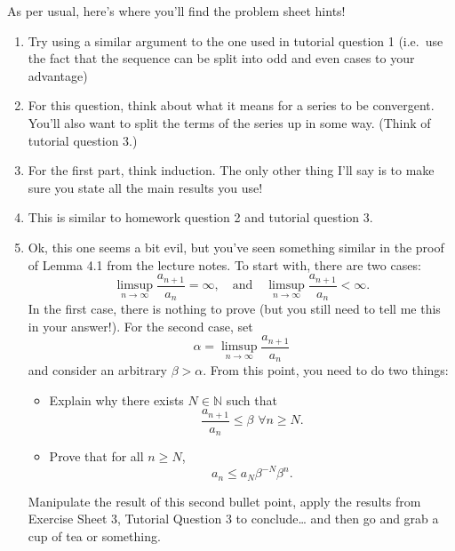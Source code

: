 \documentclass[
  12pt,
  a4paper]{extarticle}
\providecommand{\tightlist}{%
  \setlength{\itemsep}{0pt}\setlength{\parskip}{0pt}}
\theoremstyle{plain}
\theoremstyle{definition}
\theoremstyle{plain}
\theoremstyle{plain}
\theoremstyle{plain}
\theoremstyle{plain}
\theoremstyle{definition}
\theoremstyle{definition}
\theoremstyle{remark}
\theoremstyle{remark}
\renewcommand{\;}{\,}
\begin{document}
As per usual, here's where you'll find the problem sheet hints!

\begin{enumerate}
\def\labelenumi{\arabic{enumi}.}
\item
  Try using a similar argument to the one used in tutorial question 1 (i.e.~use the fact that the sequence can be split into odd and even cases to your advantage)
\item
  For this question, think about what it means for a series to be convergent. You'll also want to split the terms of the series up in some way. (Think of tutorial question 3.)
\item
  For the first part, think induction. The only other thing I'll say is to make sure you state all the main results you use!
\item
  This is similar to homework question 2 and tutorial question 3.
\item
  Ok, this one seems a bit evil, but you've seen something similar in the proof of Lemma 4.1 from the lecture notes. To start with, there are two cases: \[\limsup_{n\to\infty}\frac{a_{n+1}}{a_n} = \infty, \quad \text{and} \quad \limsup_{n\to\infty}\frac{a_{n+1}}{a_n}<\infty.\] In the first case, there is nothing to prove (but you still need to tell me this in your answer!). For the second case, set \[\alpha = \limsup_{n\to\infty}\frac{a_{n+1}}{a_n}\] and consider an arbitrary \(\beta > \alpha.\) From this point, you need to do two things:

  \begin{itemize}
  \tightlist
  \item
    Explain why there exists \(N\in\mathbb{N}\) such that \[\frac{a_{n+1}}{a_n} \leq \beta \;\; \forall n \geq N.\]
  \item
    Prove that for all \(n \geq N\), \[a_n \leq a_N\beta^{-N}\beta^n.\]
  \end{itemize}

  Manipulate the result of this second bullet point, apply the results from Exercise Sheet 3, Tutorial Question 3 to conclude\ldots{} and then go and grab a cup of tea or something.
\end{enumerate}
\end{document}
